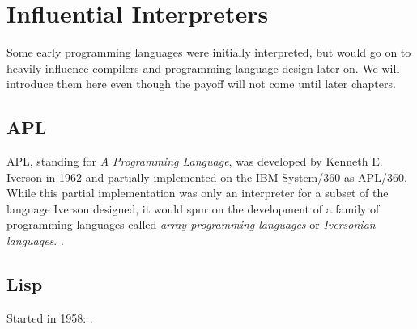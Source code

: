 \section{Influential Interpreters}

Some early programming languages were initially interpreted,
but would go on to heavily influence compilers and programming language design
later on. We will introduce them here even though the payoff will not come until
later chapters.

\subsection{APL}

APL, standing for \textit{A Programming Language}, was developed by Kenneth E. Iverson in 1962
and partially implemented on the IBM System/360 as APL/360.
While this partial implementation was only an interpreter for a subset of the language Iverson
designed, it would spur on the development of a family of programming languages
called \textit{array programming languages} or \textit{Iversonian languages}.
.

\subsection{Lisp}

Started in 1958:  .
